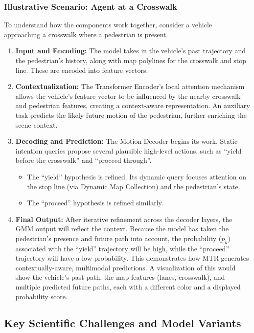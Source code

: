 \subsubsection{Illustrative Scenario: Agent at a Crosswalk}
To understand how the components work together, consider a vehicle approaching a crosswalk where a pedestrian is present.
\begin{enumerate}
    \item \textbf{Input and Encoding:} The model takes in the vehicle's past trajectory and the pedestrian's history, along with map polylines for the crosswalk and stop line. These are encoded into feature vectors.
    \item \textbf{Contextualization:} The Transformer Encoder's local attention mechanism allows the vehicle's feature vector to be influenced by the nearby crosswalk and pedestrian features, creating a context-aware representation. An auxiliary task predicts the likely future motion of the pedestrian, further enriching the scene context.
    \item \textbf{Decoding and Prediction:} The Motion Decoder begins its work. Static intention queries propose several plausible high-level actions, such as ``yield before the crosswalk'' and ``proceed through''.
    \begin{itemize}
        \item The ``yield'' hypothesis is refined. Its dynamic query focuses attention on the stop line (via Dynamic Map Collection) and the pedestrian's state.
        \item The ``proceed'' hypothesis is refined similarly.
    \end{itemize}
    \item \textbf{Final Output:} After iterative refinement across the decoder layers, the GMM output will reflect the context. Because the model has taken the pedestrian's presence and future path into account, the probability ($p_k$) associated with the ``yield'' trajectory will be high, while the ``proceed'' trajectory will have a low probability. This demonstrates how MTR generates contextually-aware, multimodal predictions. A visualization of this would show the vehicle's past path, the map features (lanes, crosswalk), and multiple predicted future paths, each with a different color and a displayed probability score.
\end{enumerate}

\subsection{Key Scientific Challenges and Model Variants}


